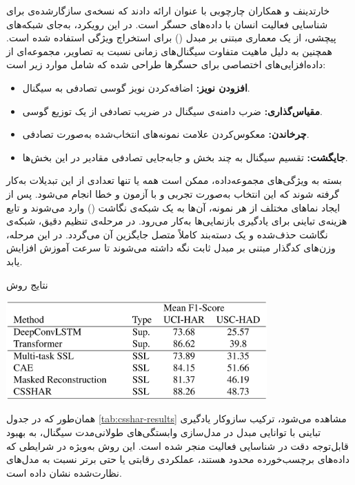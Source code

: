 خارتدینف و همکاران\cite{khaertdinov2021contrastive} چارچوبی با عنوان  ارائه دادند که نسخه‌ی سازگارشده‌ی  برای شناسایی فعالیت انسان با داده‌های حسگر است. در این رویکرد، به‌جای شبکه‌های پیچشی، از یک معماری مبتنی بر مبدل () برای استخراج ویژگی استفاده شده است. همچنین به دلیل ماهیت متفاوت سیگنال‌های زمانی نسبت به تصاویر، مجموعه‌ای از داده‌افزایی‌های اختصاصی برای حسگرها طراحی شده که شامل موارد زیر است:

\begin{itemize}
\item \textbf{افزودن نویز:} اضافه‌کردن نویز گوسی تصادفی به سیگنال.
\item \textbf{مقیاس‌گذاری:} ضرب دامنه‌ی سیگنال در ضریب تصادفی از یک توزیع گوسی.
\item \textbf{چرخاندن:} معکوس‌کردن علامت نمونه‌های انتخاب‌شده به‌صورت تصادفی.
\item \textbf{جایگشت:} تقسیم سیگنال به چند بخش و جابه‌جایی تصادفی مقادیر در این بخش‌ها.
\end{itemize}

بسته به ویژگی‌های مجموعه‌داده، ممکن است همه یا تنها تعدادی از این تبدیلات به‌کار گرفته شوند که این انتخاب به‌صورت تجربی و با آزمون و خطا انجام می‌شود. پس از ایجاد نماهای مختلف از هر نمونه، آن‌ها به یک شبکه‌ی نگاشت () وارد می‌شوند و تابع هزینه‌ی تباینی  برای یادگیری بازنمایی‌ها به‌کار می‌رود. در مرحله‌ی تنظیم دقیق، شبکه‌ی نگاشت حذف‌شده و یک دسته‌بند کاملاً متصل جایگزین آن می‌گردد. در این مرحله، وزن‌های کدگذار مبتنی بر مبدل ثابت نگه داشته می‌شوند تا سرعت آموزش افزایش یابد.

\begin{table}[htbp]
\centering
\caption{نتایج روش }
\includegraphics[width=0.75\textwidth]{Images/Chapter2/csshar-results.png}
\label{tab:csshar-results}
\end{table}

همان‌طور که در جدول \ref{tab:csshar-results} مشاهده می‌شود، ترکیب سازوکار یادگیری تباینی  با توانایی مبدل در مدل‌سازی وابستگی‌های طولانی‌مدت سیگنال، به بهبود قابل‌توجه دقت در شناسایی فعالیت منجر شده است. این روش به‌ویژه در شرایطی که داده‌های برچسب‌خورده محدود هستند، عملکردی رقابتی یا حتی برتر نسبت به مدل‌های نظارت‌شده نشان داده است.

